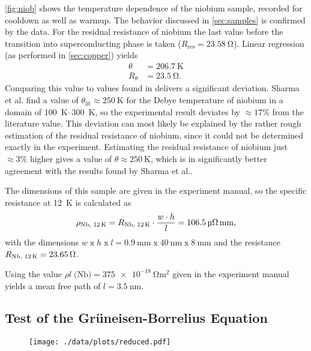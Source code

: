 \autoref{fig:niob} shows the temperature dependence of the niobium sample, recorded for cooldown as well as warmup.
The behavior discussed in \autoref{sec:samples} is confirmed by the data.
For the residual resistance of niobium the last value before the transition into superconducting phase is taken ($R_\text{res}=\SI{23.58}{\ohm}$).
Linear regression (as performed in \autoref{sec:copper}) yields
\begin{align*}
	\theta &= \SI{206.7}{\kelvin} \\
	R_\theta &= \SI{23.5}{\ohm}.
\end{align*}
Comparing this value to values found in \cite{debyenb} delivers a significant deviation.
Sharma et al. find a value of $\theta_\text{lit}\approx\SI{250}{\kelvin}$ for the Debye temperature of niobium in a domain of \SIrange{100}{300}{\kelvin}, so the experimental result deviates by $\approx 17\%$ from the literature value.
This deviation can most likely be explained by the rather rough estimation of the residual resistance of niobium, since it could not be determined exactly in the experiment. Estimating the residual resistance of niobium just $\approx 3\%$ higher gives a value of $\theta\approx\SI{250}{\kelvin}$, which is in significantly better agreement with the results found by Sharma et al..

The dimensions of this sample are given in the experiment manual, so the specific resistance at \SI{12}{\kelvin} is calculated as
\begin{equation*}
	\rho_\text{Nb, \SI{12}{\kelvin}} = R_\text{Nb, \SI{12}{\kelvin}} \cdot \frac{w \cdot h}{l} = \SI{106.5}{\micro\ohm\milli\meter},
\end{equation*}
with the dimensions $w \;\text{x}\; h \;\text{x}\; l = \SI{0.9}{\mm} \;\text{x}\; \SI{40}{\nm} \;\text{x}\; \SI{8}{\mm}$ and the resistance $R_\text{Nb, \SI{12}{\kelvin}} = \SI{23.65}{\ohm}$.

Using the value $\rho l \; \text{(Nb)} = \SI{375e-18}{\ohm\meter\squared}$ given in the experiment manual yields a mean free path of $l = \SI{3.5}{\nano\meter}$.

\subsection{Test of the Grüneisen-Borrelius Equation}
\begin{figure}
	\centering
	\texttt{[image: ./data/plots/reduced.pdf]}
	\label{fig:reduced}
\end{figure}

